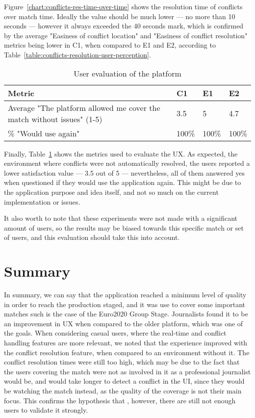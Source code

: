 Figure~\ref{chart:conflicts-res-time-over-time} shows the resolution time of conflicts over match time. Ideally the value should be much lower --- no more than 10 seconds --- however it always exceeded the 40 seconds mark, which is confirmed by the average "Easiness of conflict location" and "Easiness of conflict resolution" metrics being lower in C1, when compared to E1 and E2, according to Table~\ref{table:conflicts-resolution-user-perception}. 

\begin{table}[h]
    \centering
    \caption{User evaluation of the platform}
    \begin{tabular}{|l|l|l|l|}
        \hline
        \textbf{Metric}                        & \textbf{C1} & \textbf{E1} & \textbf{E2} \\ \hline
        Average "The platform allowed me cover the match without issues" (1-5)   & 3.5  & 5  & 4.7  \\ \hline
        \% "Would use again"   & 100\%  & 100\%  & 100\%  \\ \hline
    \end{tabular}
    \label{table:user-platform-evaluation}
\end{table}

Finally, Table~\ref{table:user-platform-evaluation} shows the metrics used to evaluate the UX. As expected, the environment where conflicts were not automatically resolved, the users reported a lower satisfaction value --- 3.5 out of 5 --- nevertheless, all of them answered yes when questioned if they would use the application again. This might be due to the application purpose and idea itself, and not so much on the current implementation or issues.

It also worth to note that these experiments were not made with a significant amount of users, so the results may be biased towards this specific match or set of users, and this evaluation should take this into account.

\section{Summary}

In summary, we can say that the application reached a minimum level of quality in order to reach the production staged, and it was use to cover some important matches such is the case of the Euro2020 Group Stage. Journalists found it to be an improvement in UX when compared to the older platform, which was one of the goals. When considering casual users, where the real-time and conflict handling features are more relevant, we noted that the experience improved with the conflict resolution feature, when compared to an environment without it. The conflict resolution times were still too high, which may be due to the fact that the users covering the match were not as involved in it as a professional journalist would be, and would take longer to detect a conflict in the UI, since they would be watching the match instead, as the quality of the coverage is not their main focus. This confirms the hypothesis that , however, there are still not enough users to validate it strongly.
